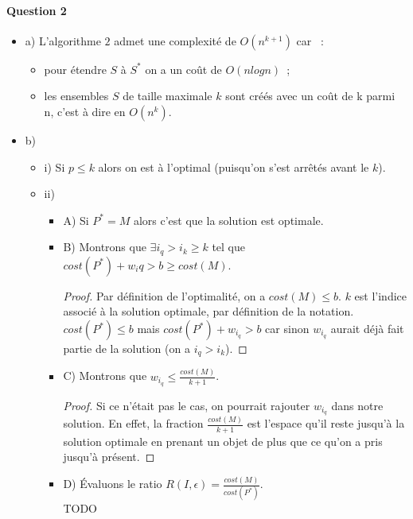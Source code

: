 \paragraph{Question 2}
\begin{itemize}
\item a) L'algorithme $2$ admet une complexité de $O(n^{k+1})$ car ~:
\begin{itemize}
\item pour étendre $S$ à $S^*$ on a un coût de $O(nlogn)$~;
\item les ensembles $S$ de taille maximale $k$ sont créés avec un coût
de k parmi n, c'est à dire en $O(n^k)$.
\end{itemize}
\item b)
\begin{itemize}
\item i) Si $p \leq k$ alors on est à l'optimal (puisqu'on s'est
arrêtés avant le $k$).
\item ii)
\begin{itemize}
\item A) Si $P^*=M$ alors c'est que la solution est optimale.
\item B) Montrons que $\exists i_q > i_k \geq k$ tel que
$cost(P^*)+w_iq > b \geq cost(M)$.
\begin{proof}
Par définition de l'optimalité, on a $cost(M) \leq b$. $k$ est
l'indice associé à la solution optimale, par définition de la
notation. \\
$cost(P^*) \leq b$ mais $cost(P^*) + w_{i_q} > b$ car sinon $w_{i_q}$
aurait déjà fait partie de la solution (on a $i_q > i_k$). 
\end{proof}
\item C) Montrons que $w_{i_q} \leq \frac{cost(M)}{k+1}$.
\begin{proof}
Si ce n'était pas le cas, on pourrait rajouter $w_{i_q}$ dans
notre solution. En effet, la fraction $\frac{cost(M)}{k+1}$ est
l'espace qu'il reste jusqu'à la solution optimale en prenant un objet
de plus que ce qu'on a pris jusqu'à présent.
\end{proof}
\item D) Évaluons le ratio $R(I, \epsilon)
= \frac{cost(M)}{cost(P^*)}$. \\
TODO


\end{itemize}
\end{itemize}
\end{itemize}
